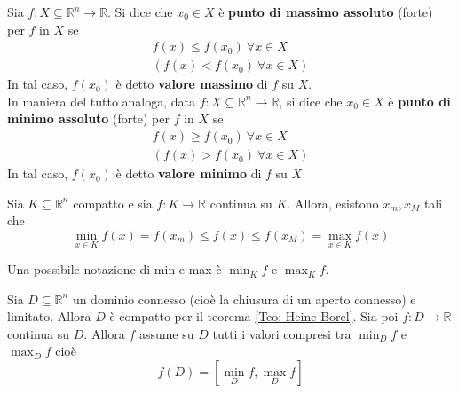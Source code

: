 \begin{definition}
Sia $f:X \subseteq \mathbb{R}^n \to \mathbb{R}$. Si dice che $x_0 \in X$ è \textbf{punto di massimo assoluto} (forte) per $f$ in $X$ se
\begin{equation}
    \begin{aligned}
        f(x) \leq f(x_0) \ \forall x  \in X \\
        (f(x) < f(x_0) \ \forall x  \in X)
    \end{aligned}
\end{equation}
In tal caso, $f(x_0)$ è detto \textbf{valore massimo} di $f$ su $X$.\\
In maniera del tutto analoga, data $f:X \subseteq \mathbb{R}^n \to \mathbb{R}$, si dice che $x_0 \in X$ è \textbf{punto di minimo assoluto} (forte) per $f$ in $X$ se
\begin{equation}
    \begin{aligned}
        f(x) \geq f(x_0) \ \forall x \in X\\
        (f(x)>f(x_0) \ \forall x \in X)
    \end{aligned}
\end{equation}
In tal caso, $f(x_0)$ è detto \textbf{valore minimo} di $f$ su $X$
\end{definition}
\begin{theorem}[Weierstrass] \label{Teo: Weierstrass}
    Sia $K \subseteq \mathbb{R}^n$ compatto e sia $f: K \to \mathbb{R}$ continua su $K$. Allora, esistono $x_m, x_M$ tali che
    \begin{equation}
    \min_{x \in K}{f(x)}= f(x_m) \leq f(x) \leq f(x_M) = \max_{x \in K}{f(x)}    
    \end{equation}
\end{theorem}
    \begin{oss}
        Una possibile notazione di min e max è $ \min_{K}{f}$ e $\max_{K}{f}$.
    \end{oss}
\begin{theorem} \label{Teo: Valori intermedi}
    Sia $D \subseteq \mathbb{R}^n$ un dominio connesso (cioè la chiusura di un aperto connesso) e limitato. Allora $D$ è compatto per il teorema \ref{Teo: Heine Borel}.
    Sia poi $f:D \to \mathbb{R}$ continua su $D$. Allora $f$ assume su $D$ tutti i valori compresi tra $\min_{D}{f}$ e $\max_{D}{f}$ cioè
    \begin{equation}
        f(D)=\left[ \min_{D}{f}, \max_{D}{f}\right]
    \end{equation}
\end{theorem}
